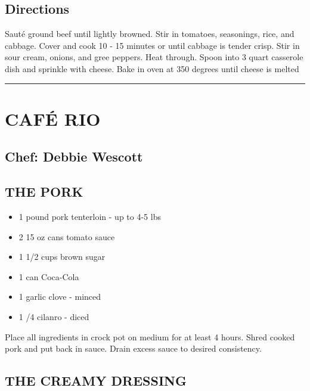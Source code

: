 \documentclass[
]{book}
\providecommand{\tightlist}{%
  \setlength{\itemsep}{0pt}\setlength{\parskip}{0pt}}
\begin{document}
\hypertarget{directions-45}{%
\subsection*{Directions}\label{directions-45}}


Sauté ground beef until lightly browned. Stir in tomatoes, seasonings, rice, and cabbage.
Cover and cook 10 - 15 minutes or until cabbage is tender crisp. Stir in sour cream, onions,
and gree peppers. Heat through. Spoon into 3 quart casserole dish and sprinkle with cheese.
Bake in oven at 350 degrees until cheese is melted

\begin{center}\rule{0.5\linewidth}{0.5pt}\end{center}

\hypertarget{cafuxe9-rio}{%
\section*{CAFÉ RIO}\label{cafuxe9-rio}}


\hypertarget{chef-debbie-wescott-2}{%
\subsection*{Chef: Debbie Wescott}\label{chef-debbie-wescott-2}}


\hypertarget{the-pork}{%
\subsection*{THE PORK}\label{the-pork}}


\begin{itemize}
\tightlist
\item
  1 pound pork tenterloin - up to 4-5 lbs
\item
  2 15 oz cans tomato sauce
\item
  1 1/2 cups brown sugar
\item
  1 can Coca-Cola
\item
  1 garlic clove - minced
\item
  1 /4 cilanro - diced
\end{itemize}

Place all ingredients in crock pot on medium for at least 4 hours.
Shred cooked pork and put back in sauce.
Drain excess sauce to desired consistency.

\hypertarget{the-creamy-dressing}{%
\subsection*{THE CREAMY DRESSING}\label{the-creamy-dressing}}
\end{document}
